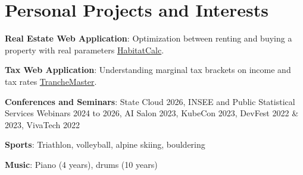 \documentclass[a4paper,10pt]{article}
\newcommand{\resumeItem}[2]{
  \item\small{
    \textbf{#1}{: #2\vspace{-0.8pt}}
  }
}
\newcommand{\resumeSubItem}[2]{
    \small{\resumeItem{#1}{#2}\vspace{-4pt}}
	
}
\newcommand{\resumeSubHeadingListStart}{\begin{itemize}[leftmargin=*]}
\newcommand{\resumeSubHeadingListEnd}{\end{itemize}}
\begin{document}

\section{Personal Projects and Interests}
\vspace{0.5mm}
\begin{minipage}[t]{0.9865\textwidth}
\resumeSubHeadingListStart
  \resumeSubItem{Real Estate Web Application}{Optimization between renting and buying a property with real parameters \href{https://odysseu.github.io/HabitatCalc/}{HabitatCalc}.}
  \resumeSubItem{Tax Web Application}{Understanding marginal tax brackets on income and tax rates \href{https://odysseu.github.io/TrancheMaster/}{TrancheMaster}.}
  \resumeSubItem{Conferences and Seminars}{State Cloud 2026, INSEE and Public Statistical Services Webinars 2024 to 2026, AI Salon 2023, KubeCon 2023, DevFest 2022 \& 2023, VivaTech 2022}
  \resumeSubItem{Sports}{Triathlon, volleyball, alpine skiing, bouldering}
  \resumeSubItem{Music}{Piano (4 years), drums (10 years)}
\resumeSubHeadingListEnd
\end{minipage}


\end{document}
